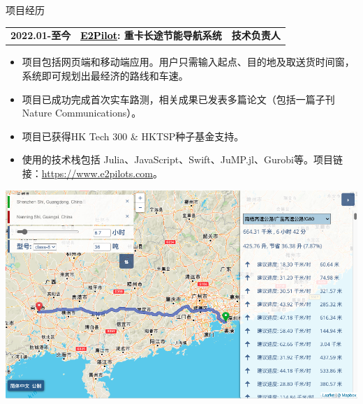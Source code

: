 \documentclass{resume} %
\makeatletter
\newcommand{\projectheader}[3]{%
  \begin{tabular*}{\linewidth}{@{}l@{\extracolsep{\fill}}l@{\extracolsep{\fill}}r@{}}
    \textbf{#1} & \textbf{#2} & \textbf{#3} \\
  \end{tabular*}%
  \vspace{-0.5em} %
}
\makeatother
\begin{document}
\begin{rSection}{项目经历}
    \projectheader{2022.01-至今}{\href{https://www.e2pilots.com/}{\textcolor{black}{E2Pilot}}: 重卡长途节能导航系统}{技术负责人}

    \begin{minipage}[h]{0.65\textwidth} %
        \begin{itemize}
            \item 项目包括网页端和移动端应用。用户只需输入起点、目的地及取送货时间窗，系统即可规划出最经济的路线和车速。%
            \item 项目已成功完成首次实车路测，相关成果已发表多篇论文（包括一篇子刊Nature Communications）。
            \item 项目已获得HK Tech 300 \& HKTSP种子基金支持。
            \item 使用的技术栈包括 Julia、JavaScript、Swift、JuMP.jl、Gurobi等。项目链接：\href{https://www.e2pilots.com/}{https://www.e2pilots.com}。
        \end{itemize}
    \end{minipage}%
    \hfill %
    \begin{minipage}[h]{0.35\textwidth} %
        \centering
        \includegraphics[width=.80\textwidth]{e2pilot-web.png} %
    \end{minipage}



\end{rSection}
\end{document}
